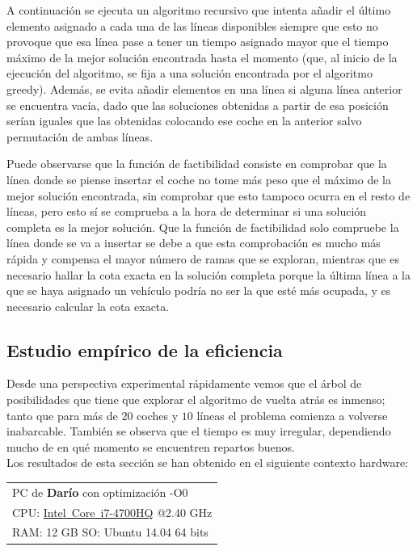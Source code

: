 \documentclass[a4paper, 11pt]{article}
\makeatletter
\newcommand{\spec}[6]{
	\bgroup
	\def\arraystretch{1.2}
	\begin{tabular}{|l|}
		\hline
		PC de \textbf{#1} con optimización -O#6\\
		CPU: #2 @#3 GHz\\RAM: #4 GB \hspace{0.8cm} SO: #5 \\
		\hline
	\end{tabular}
	\egroup
	\vspace*{0.2cm}
}
\def\arraystretch{1.2} %
\makeatother
\begin{document}


A continuación se ejecuta un algoritmo recursivo que intenta añadir el último elemento asignado a cada una de las líneas disponibles siempre que esto no provoque que esa línea pase a tener un tiempo asignado mayor que el tiempo máximo de la mejor solución encontrada hasta el momento (que, al inicio de la ejecución del algoritmo, se fija a una solución encontrada por el algoritmo greedy). Además, se evita añadir elementos en una línea si alguna línea anterior se encuentra vacía, dado que las soluciones obtenidas a partir de esa posición serían iguales que las obtenidas colocando ese coche en la anterior salvo permutación de ambas líneas.



Puede observarse que la función de factibilidad consiste en comprobar que la línea donde se piense insertar el coche no tome más peso que el máximo de la mejor solución encontrada, sin comprobar que esto tampoco ocurra en el resto de líneas, pero esto sí se comprueba a la hora de determinar si una solución completa es la mejor solución. Que la función de factibilidad solo compruebe la línea donde se va a insertar se debe a que esta comprobación es mucho más rápida y compensa el mayor número de ramas que se exploran, mientras que es necesario hallar la cota exacta en la solución completa porque la última línea a la que se haya asignado un vehículo podría no ser la que esté más ocupada, y es necesario calcular la cota exacta.

\subsection{Estudio empírico de la eficiencia}

Desde una perspectiva experimental rápidamente vemos que el árbol de posibilidades que tiene que explorar el algoritmo de vuelta atrás es inmenso; tanto que para más de $20$ coches y $10$ líneas el problema comienza a volverse inabarcable. También se observa que el tiempo es muy irregular, dependiendo mucho de en qué momento se encuentren repartos buenos. \\

Los resultados de esta sección se han obtenido en el siguiente contexto hardware: \\
\spec{Darío}{\href{http://ark.intel.com/products/75116}{Intel\textregistered\ Core\texttrademark\ i7-4700HQ}}{2.40}{12}{Ubuntu 14.04 64 bits}{0} \\
\end{document}

